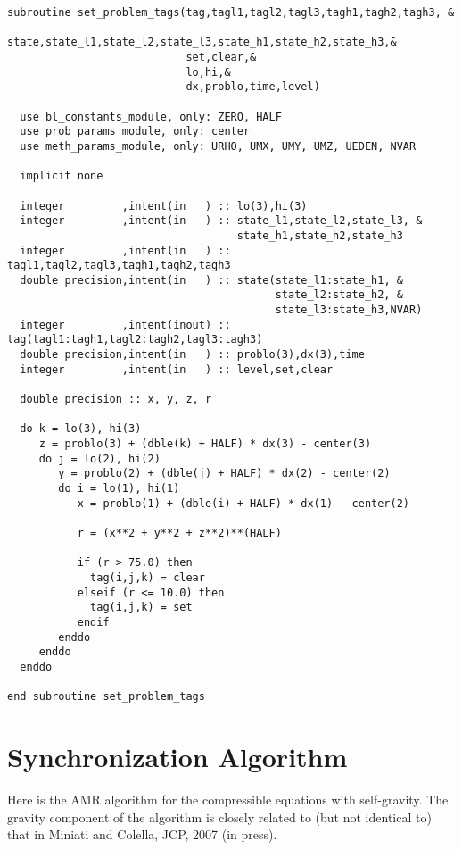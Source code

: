 \begin{verbatim}
subroutine set_problem_tags(tag,tagl1,tagl2,tagl3,tagh1,tagh2,tagh3, &
                            state,state_l1,state_l2,state_l3,state_h1,state_h2,state_h3,&
                            set,clear,&
                            lo,hi,&
                            dx,problo,time,level)

  use bl_constants_module, only: ZERO, HALF
  use prob_params_module, only: center
  use meth_params_module, only: URHO, UMX, UMY, UMZ, UEDEN, NVAR
 
  implicit none
  
  integer         ,intent(in   ) :: lo(3),hi(3)
  integer         ,intent(in   ) :: state_l1,state_l2,state_l3, &
                                    state_h1,state_h2,state_h3
  integer         ,intent(in   ) :: tagl1,tagl2,tagl3,tagh1,tagh2,tagh3
  double precision,intent(in   ) :: state(state_l1:state_h1, &
                                          state_l2:state_h2, &
                                          state_l3:state_h3,NVAR)
  integer         ,intent(inout) :: tag(tagl1:tagh1,tagl2:tagh2,tagl3:tagh3)
  double precision,intent(in   ) :: problo(3),dx(3),time
  integer         ,intent(in   ) :: level,set,clear

  double precision :: x, y, z, r

  do k = lo(3), hi(3)
     z = problo(3) + (dble(k) + HALF) * dx(3) - center(3)
     do j = lo(2), hi(2)
        y = problo(2) + (dble(j) + HALF) * dx(2) - center(2)
        do i = lo(1), hi(1)
           x = problo(1) + (dble(i) + HALF) * dx(1) - center(2)

           r = (x**2 + y**2 + z**2)**(HALF)

           if (r > 75.0) then
             tag(i,j,k) = clear
           elseif (r <= 10.0) then
             tag(i,j,k) = set
           endif
        enddo
     enddo
  enddo
  
end subroutine set_problem_tags
\end{verbatim}

\section{Synchronization Algorithm}

Here is the AMR algorithm for the compressible equations with
self-gravity.  The gravity component of the algorithm is closely
related to (but not identical to) that in Miniati and Colella, JCP,
2007 (in press).

